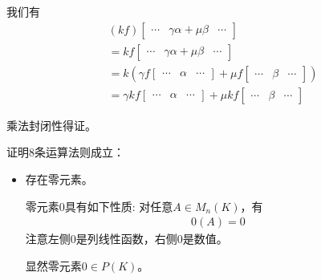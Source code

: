 \documentclass{article}
\begin{document}
\begin{itemize}
\begin{itemize}
                我们有
                \begin{align*}
                   & (kf)\begin{bmatrix}
                           \cdots & \gamma \alpha + \mu \beta & \cdots
                         \end{bmatrix}                  \\
                   & =k f \begin{bmatrix}
                            \cdots & \gamma \alpha + \mu \beta & \cdots
                          \end{bmatrix}                 \\
                   & = k \left(\gamma f \begin{bmatrix}
                                          \cdots & \alpha & \cdots
                                        \end{bmatrix} + \mu f \begin{bmatrix}
                                                                \cdots & \beta & \cdots
                                                              \end{bmatrix}\right) \\
                   & =  \gamma kf \begin{bmatrix}
                                    \cdots & \alpha & \cdots
                                  \end{bmatrix}
                  + \mu kf \begin{bmatrix}
                             \cdots & \beta & \cdots
                           \end{bmatrix}
                \end{align*}

                乘法封闭性得证。
        \end{itemize}

        证明8条运算法则成立：

        \begin{itemize}
          \item 存在零元素。

                零元素$0$具有如下性质: 对任意$A \in M_n(K)$，有
                \begin{align*}
                  0(A) = 0
                \end{align*}
                注意左侧$0$是列线性函数，右侧$0$是数值。

                显然零元素$0 \in P(K)$。


\end{itemize}
\end{itemize}
\end{document}

